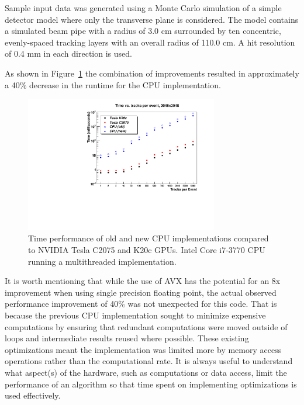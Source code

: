 \documentclass{JINST}
\begin{document}
Sample input data was generated using a Monte Carlo simulation of a simple detector model where only the transverse plane is considered.  The model contains a simulated beam pipe with a radius of 3.0 cm surrounded by ten concentric, evenly-spaced tracking layers with an overall radius of 110.0 cm.  A hit resolution of 0.4 mm in each direction is used.

As shown in Figure~\ref{fig:TimePerformance} the combination of improvements resulted in approximately a 40\% decrease in the runtime for the CPU implementation.

\begin{figure}[!Hhtb]
\begin{center}
\includegraphics[width=0.75\textwidth]{figs/TimePerformance.pdf} 
\caption{Time performance of old and new CPU implementations compared to NVIDIA Tesla C2075 and K20c GPUs. 
 Intel Core i7-3770 CPU running a multithreaded implementation.\label{fig:TimePerformance}}
\end{center}
\end{figure}

It is worth mentioning that while the use of AVX has the potential for an 8x improvement when using single precision floating point, the actual observed performance improvement of 40\% was not unexpected for this code.  That is because the previous CPU implementation sought to minimize expensive computations by ensuring that redundant computations were moved outside of loops and intermediate results reused where possible.  These existing optimizations meant the implementation was limited more by memory access operations rather than the computational rate.  It is always useful to understand what aspect(s) of the hardware, such as computations or data access, limit the performance of an algorithm so that time spent on implementing optimizations is used effectively.
\end{document}
